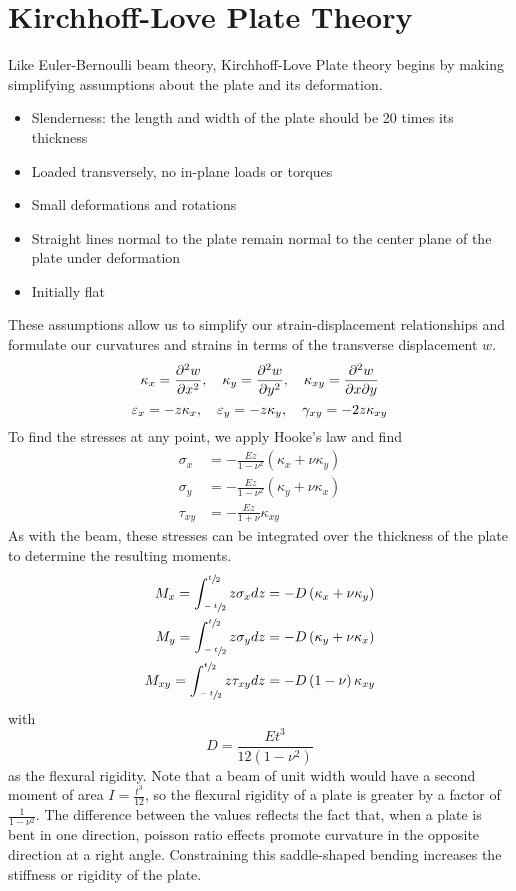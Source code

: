 \section{Kirchhoff-Love Plate Theory}
Like Euler-Bernoulli beam theory, Kirchhoff-Love Plate theory begins by making simplifying assumptions about the plate and its deformation.
\begin{itemize}
 \item Slenderness: the length and width of the plate should be 20 times its thickness
 \item Loaded transversely, no in-plane loads or torques
 \item Small deformations and rotations
 \item Straight lines normal to the plate remain normal to the center plane of the plate under deformation
 \item Initially flat
\end{itemize}
These assumptions allow us to simplify our strain-displacement relationships and formulate our curvatures and strains in terms of the transverse displacement $w$.
\begin{equation}
    \kappa_x=\frac{\partial^2 w}{\partial x^2}, \quad \kappa_y= \frac{\partial^2 w}{\partial y^2}, \quad \kappa_{xy}=\frac{\partial^2 w}{\partial x\partial y}\notag
\end{equation}
\begin{equation}
\varepsilon_x = -z \kappa_x, \quad \varepsilon_y = -z \kappa_y, \quad \gamma_{xy} = -2 z \kappa_{xy} \notag
\end{equation}
To find the stresses at any point, we apply Hooke's law and find
\begin{align*}
\sigma_x &= -\frac{E z}{1-\nu^2}\left(\kappa_x+\nu\kappa_y\right)\\
\sigma_y &= -\frac{E z}{1-\nu^2}\left(\kappa_y+\nu\kappa_x\right)\\
\tau_{xy} &= -\frac{Ez}{1+\nu}\kappa_{xy}
\end{align*}
As with the beam, these stresses can be integrated over the thickness of the plate to determine the resulting moments.
\begin{align*}
M_x = \int_{\sfrac{-t}{2}}^{\sfrac{t}{2}}z\sigma_x dz &=-D\left(\kappa_x+\nu\kappa_y\right)\\
M_y = \int_{\sfrac{-t}{2}}^{\sfrac{t}{2}}z\sigma_y dz &=-D\left(\kappa_y+\nu\kappa_x\right)\\
M_{xy} = \int_{\sfrac{-t}{2}}^{\sfrac{t}{2}}z\tau_{xy}dz &= -D\left(1-\nu\right)\kappa_{xy}
\end{align*}
with
\begin{equation*}
D=\frac{Et^3}{12\left(1-\nu^2\right)}
\end{equation*}
as the flexural rigidity.
Note that a beam of unit width would have a second moment of area $I = \frac{t^3}{12}$, so the flexural rigidity of a plate is greater by a factor of $\frac{1}{1-\nu^2}$.
The difference between the values reflects the fact that, when a plate is bent in one direction, poisson ratio effects promote curvature in the opposite direction at a right angle.
Constraining this saddle-shaped bending increases the stiffness or rigidity of the plate.

